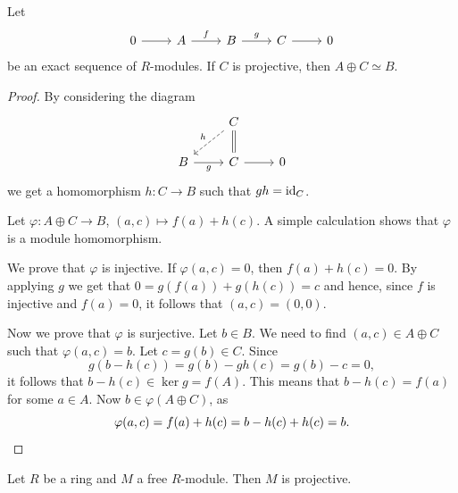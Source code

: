 \begin{proposition}
\label{pro:split}
	Let 
	\[
	   \begin{tikzcd}
        0 & A & B & C & 0
        \arrow[from=1-1, to=1-2]
        \arrow["f", from=1-2, to=1-3]
        \arrow["g", from=1-3, to=1-4]
        \arrow[from=1-4, to=1-5]
    \end{tikzcd}
	\]
	be an exact sequence of $R$-modules.  If $C$ is projective, then $A\oplus C\simeq B$. 
\end{proposition}

\begin{proof}
    By considering the diagram
\[\begin{tikzcd}
	& C \\
	B & C & 0
	\arrow["g"', from=2-1, to=2-2]
	\arrow[from=2-2, to=2-3]
	\arrow[equal, no head, from=1-2, to=2-2]
	\arrow["h"', dashed, from=1-2, to=2-1]
\end{tikzcd}\]
	we get a homomorphism $h\colon C\to B$
	such that $gh=\operatorname{id}_C$. 

	Let $\varphi\colon A\oplus C\to B$, $(a,c)\mapsto f(a)+h(c)$. A simple
	calculation shows that $\varphi$ is a module homomorphism. 

	We prove that $\varphi$ is 
	injective. If $\varphi(a,c)=0$, then $f(a)+h(c)=0$. By applying $g$ we get that
	$0=g(f(a))+g(h(c))=c$ and hence, since $f$ is injective and
	$f(a)=0$, it follows that $(a,c)=(0,0)$. 
		
	Now we prove that $\varphi$ is surjective. 
	Let $b\in B$. 
	We need to find $(a,c)\in A\oplus C$ such that $\varphi(a,c)=b$. 
	Let $c=g(b)\in C$. Since
	\[
		g(b-h(c))=g(b)-gh(c)=g(b)-c=0,
	\]
	it follows that $b-h(c)\in \ker g=f(A)$. This means
	that $b-h(c)=f(a)$ for some $a\in A$. Now $b\in \varphi(A\oplus C)$, as
	\[
		\varphi(a,c)=f(a)+h(c)=b-h(c)+h(c)=b.\qedhere
	\]
\end{proof}


\begin{proposition}
	\label{pro:free=>projective}
    Let $R$ be a ring and $M$ a free $R$-module. Then $M$ is projective. 
\end{proposition}

